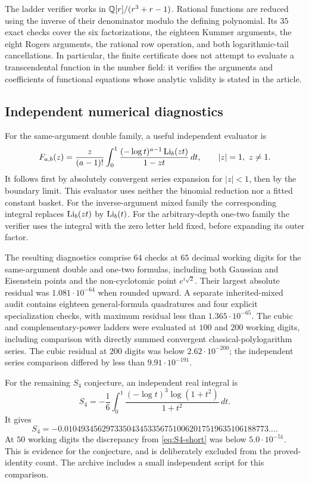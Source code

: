 The ladder verifier works in
\(\mathbb Q[r]/(r^3+r-1)\). Rational functions are reduced using the inverse
of their denominator modulo the defining polynomial. Its \(35\) exact
checks cover the six factorizations, the eighteen Kummer arguments,
the eight Rogers arguments, the rational row operation, and both
logarithmic-tail cancellations. In particular, the finite certificate
does not attempt to evaluate a transcendental function in the number
field: it verifies the arguments and coefficients of functional equations
whose analytic validity is stated in the article.

\subsection{Independent numerical diagnostics}

For the same-argument double family, a useful independent evaluator is
\begin{equation}
F_{a,b}(z)=\frac{z}{(a-1)!}
\int_0^1\frac{(-\log t)^{a-1}\operatorname{Li}_b(zt)}{1-zt}\,dt,
\qquad |z|=1,\ z\ne1.
\label{eq:double-quadrature}
\end{equation}
It follows first by absolutely convergent series expansion for \(|z|<1\),
then by the boundary limit. This evaluator uses neither the binomial
reduction nor a fitted constant basket.
For the inverse-argument mixed family the corresponding integral replaces
\(\operatorname{Li}_b(zt)\) by \(\operatorname{Li}_b(t)\).
For the arbitrary-depth one-two family the verifier uses the integral
with the zero letter held fixed, before expanding its outer factor.

The resulting diagnostics comprise \(64\) checks at \(65\) decimal
working digits for the same-argument double and one-two formulas,
including both Gaussian and Eisenstein points and the non-cyclotomic
point \(e^{i\sqrt2}\). Their largest absolute residual was
\(1.081\cdot10^{-64}\) when rounded upward.
A separate inherited-mixed audit contains eighteen general-formula
quadratures and four explicit specialization checks, with maximum
residual less than \(1.365\cdot10^{-65}\).
The cubic and complementary-power ladders were evaluated at \(100\)
and \(200\) working digits, including comparison with directly summed
convergent classical-polylogarithm series. The cubic residual at
\(200\) digits was below \(2.62\cdot10^{-200}\); the independent
series comparison differed by less than \(9.91\cdot10^{-191}\).

For the remaining \(S_4\) conjecture, an independent real integral is
\[
S_4=-\frac16\int_0^1
\frac{(-\log t)^3\log(1+t^2)}{1+t^2}\,dt.
\]
It gives
\[
S_4=-0.0104934562973350434533567510062017519635106188773\ldots.
\]
At \(50\) working digits the discrepancy from
\eqref{eq:S4-short} was below \(5.0\cdot10^{-51}\).
This is evidence for the conjecture, and is deliberately excluded from
the proved-identity count. The archive includes a small independent
script for this comparison.

